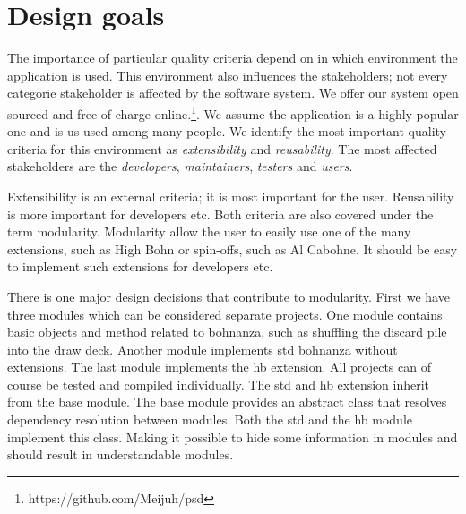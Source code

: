 \section{Design goals}
The importance of particular quality criteria depend on in which environment the application is
used. This environment also influences the stakeholders; not every categorie stakeholder is affected
by the software system. We offer our system open sourced and free of charge
online.\footnote{https://github.com/Meijuh/psd}. We assume the application is a highly popular one
and is us used among many people. We identify the most important quality criteria for this
environment as \emph{extensibility} and \emph{reusability}. The most affected stakeholders are the
\emph{developers}, \emph{maintainers}, \emph{testers} and \emph{users}.

Extensibility is an external criteria; it is most important for the user. Reusability is more
important for developers etc. Both criteria are also covered under the term modularity. Modularity
allow the user to easily use one of the many extensions, such as High Bohn or spin-offs, such as Al
Cabohne. It should be easy to implement such extensions for developers etc.

There is one major design decisions that contribute to modularity. First we have three modules
which can be considered separate projects. One module contains basic objects and method related to
bohnanza, such as shuffling the discard pile into the draw deck. Another module implements \gls{std} 
bohnanza without extensions. The last module implements the \gls{hb} extension. All projects can
of course be tested and compiled individually. The \gls{std} and \gls{hb} extension inherit from the
base module. The base module provides an abstract class that resolves dependency resolution between
modules. Both the \gls{std} and the \gls{hb} module implement this class. Making it possible to hide
some information in modules and should result in understandable modules. 

